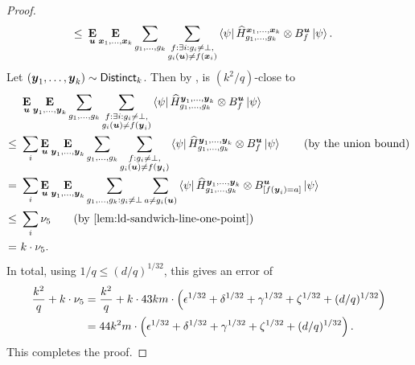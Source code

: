 \begin{proof}
\begin{align}
\leq~&\mathop{\bf E\/}_{\boldsymbol{u}}\mathop{\bf E\/}_{{\boldsymbol{x}}_1, \ldots, {\boldsymbol{x}}_k} \sum_{g_1, \ldots, g_k} \sum_{\substack{f: \exists i: g_i \neq \bot, \\g_i(\boldsymbol{u}) \neq f({\boldsymbol{x}}_i)}} \bra{\psi} \widehat{H}^{{\boldsymbol{x}}_1, \ldots, {\boldsymbol{x}}_k}_{g_1, \ldots, g_k} \otimes B^{\boldsymbol{u}}_f \ket{\psi}.\label{eq:keep-on-contractin}
\end{align}
Let $(\boldsymbol{y}_1, \ldots, \boldsymbol{y}_k) \sim \mathsf{Distinct}_{k}$. Then by , 
is $(k^2/q)$-close to
\begin{align*}
&\E_{\bu}\E_{\by_1, \ldots, \by_k} \sum_{g_1, \ldots, g_k} \sum_{\substack{f: \exists i: g_i \neq \bot, \\g_i(\bu) \neq f(\by_i)}} \bra{\psi} \widehat{H}^{\by_1, \ldots, \by_k}_{g_1, \ldots, g_k} \otimes B^{\bu}_f \ket{\psi}\\
\leq~&
\sum_i \E_{\bu}\E_{\by_1, \ldots, \by_k} \sum_{g_1, \ldots, g_k} \sum_{\substack{f: g_i \neq \bot, \\g_i(\bu) \neq f(\by_i)}} \bra{\psi} \widehat{H}^{\by_1, \ldots, \by_k}_{g_1, \ldots, g_k} \otimes B^{\bu}_f \ket{\psi} \tag{by the union bound}\\
=~&
\sum_i \E_{\bu}\E_{\by_1, \ldots, \by_k} \sum_{g_1, \ldots, g_k:g_i \neq \bot} \sum_{a \neq g_i(\bu)} \bra{\psi} \widehat{H}^{\by_1, \ldots, \by_k}_{g_1, \ldots, g_k} \otimes B^{\bu}_{[f(\by_i)=a]} \ket{\psi}\\
\leq~& \sum_i \nu_5 \tag{by \Cref{lem:ld-sandwich-line-one-point}}\\
=~& k \cdot \nu_5.
\end{align*}
In total, using $1/q \leq (d/q)^{1/32}$, this gives an error of
\begin{align*}
\frac{k^2}{q} + k \cdot \nu_5
& = \frac{k^2}{q} + k \cdot 43 km \cdot \left(\epsilon^{1/32} + \delta^{1/32} + \gamma^{1/32} + \zeta^{1/32} + (d/q)^{1/32}\right)\\
& = 44 k^2m \cdot \left(\epsilon^{1/32} + \delta^{1/32} + \gamma^{1/32} + \zeta^{1/32} + (d/q)^{1/32}\right).
\end{align*}
This completes the proof.
\end{proof}


